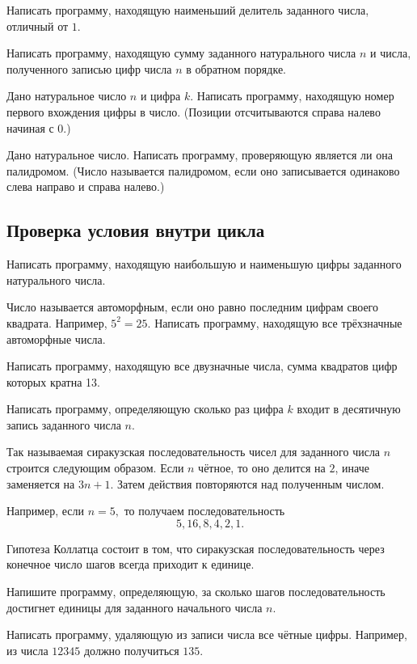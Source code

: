 \task Написать программу, находящую наименьший делитель заданного
числа, отличный от $1.$

\task Написать программу, находящую сумму заданного натурального числа
$n$ и числа, полученного записью цифр числа $n$ в обратном порядке.

\task Дано натуральное число $n$ и цифра $k.$ Написать программу,
находящую номер первого вхождения цифры в число. (Позиции
отсчитываются справа налево начиная с 0.)

\task Дано натуральное число. Написать программу, проверяющую является
ли она палидромом. (Число называется палидромом, если
оно записывается одинаково слева направо и справа налево.)


\subsection{Проверка условия внутри цикла}

\task Написать программу, находящую наибольшую и наименьшую цифры
заданного натурального числа.

\task Число называется автоморфным, если оно
равно последним цифрам своего квадрата. Например, $5^2=25$. Написать
программу, находящую все трёхзначные автоморфные числа.

\task Написать программу, находящую все двузначные числа, сумма
квадратов цифр которых кратна 13.

\task Написать программу, определяющую сколько раз цифра $k$ входит в
десятичную запись заданного числа $n$.

\task Так называемая сиракузская
последовательность чисел для
заданного числа $n$ строится следующим образом. Если $n$ чётное, то
оно делится на $2$, иначе заменяется на $3n+1$. Затем действия
повторяются над полученным числом.

Например, если $n=5,$ то получаем последовательность
\[
5, 16, 8, 4, 2, 1.
\]

Гипотеза Коллатца состоит в том, что
сиракузская последовательность через конечное число шагов всегда
приходит к единице.

Напишите программу, определяющую, за сколько шагов последовательность
достигнет единицы для заданного начального числа $n$.

\task Написать программу, удаляющую из записи числа все чётные
цифры. Например, из числа $12345$ должно получиться $135$.

